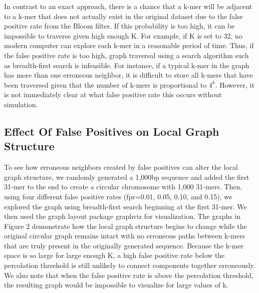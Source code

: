 \documentclass[12pt]{article} \usepackage{simplemargins}
\begin{document}
In contrast to an exact
approach, there is a chance that a k-mer will be adjacent to a k-mer
that does not actually exist in the original dataset due to the false
positive rate from the Bloom filter. If this probability is too high,
it can be impossible to traverse given high enough K. For example, if
K is set to 32, no modern computer can explore each k-mer in a
reasonable period of time. Thus, if the false positive rate is too
high, graph traversal using a search algorithm such as breadth-first
search is infeasible. For instance, if a typical k-mer in the graph has 
more than one erroneous neighbor, it is difficult to store all k-mers 
that have been traversed given that the number of k-mers is proportional 
to $4^k$. However, it is not immediately clear 
at what false positive rate this occurs without simulation.

\subsection{Effect Of False Positives on Local Graph Structure}
To see how erroneous neighbors created by false positives can alter 
the local graph structure, we randomly generated a 1,000bp sequence 
and added the first 31-mer to
the end to create a circular chromosome with 1,000 31-mers. Then,
using four different false positive rates (fpr=0.01, 0.05, 0.10, and
0.15), we explored the graph using breadth-first search beginning at
the first 31-mer. We then used the graph
layout package graphviz for visualization. The graphs in Figure 
2 demonstrate how
the local graph structure begins to change while the original circular
graph remains intact with no erroneous paths between k-mers that are
truly present in the originally generated sequence. Because the k-mer
space is so large for large enough K, a high false positive rate below
the percolation threshold is still unlikely to connect components
together erroneously. We also note that when the false positive
rate is above the percolation threshold, the resulting graph would be
impossible to visualize for large values of k.
\end{document}
